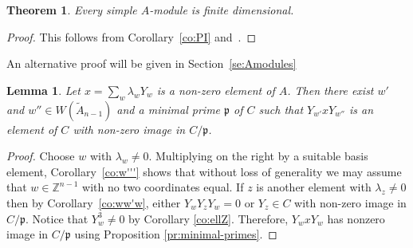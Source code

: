 \documentclass[12pt]{amsart}
\newcommand{\bZ}{{\mathbb{Z}}}
\newcommand{\mfp}{\mathfrak{p}}
\numberwithin{equation}{section}
\newtheorem{theorem}[equation]{Theorem}
\newtheorem{lemma}[equation]{Lemma}
\theoremstyle{definition}
\begin{document}
\begin{theorem}\label{th:fd}
Every simple $A$-module is finite dimensional.
\end{theorem}
\begin{proof}
This follows from Corollary~\ref{co:PI}
and~\cite[Theorem~13.10.3]{McConnell/Robson:2001a}. 
\end{proof}

An alternative proof will be given in Section~\ref{se:Amodules}


\begin{lemma}\label{le:primeC}
Let $x=\sum_w\lambda_w Y_w$ is a non-zero element of $A$. Then there
exist $w'$ and $w'' \in W(\tilde A_{n-1})$ and a minimal prime $\mfp$
of $C$ such that $Y_{w'} x Y_{w''}$ is an element of $C$ with non-zero
image in $C/\mfp$.
\end{lemma}
\begin{proof}
Choose $w$ with $\lambda_w\ne 0$. Multiplying on the right by a
suitable basis element, Corollary~\ref{co:w'''} shows that without loss of
generality we may assume that $w\in\bZ^{n-1}$ with no two coordinates
equal. 
If $z$ is another element with $\lambda_z\ne 0$
then by Corollary~\ref{co:ww'w}, either $Y_wY_zY_w=0$ or $Y_z\in C$ with
non-zero image in $C/\mfp$. Notice that $Y_w^3\neq 0$ by Corollary
\ref{co:ellZ}. Therefore, $Y_wxY_w$ has nonzero image in $C/\mfp$
using Proposition \ref{pr:minimal-primes}. 
\end{proof}
\end{document}
